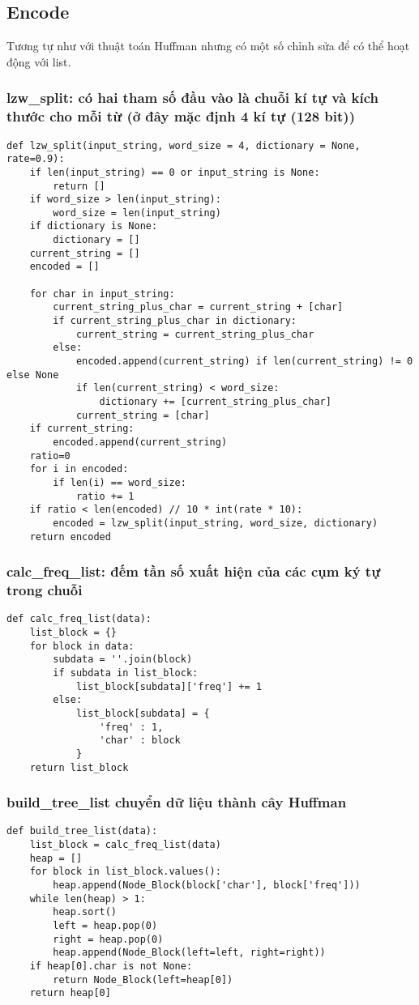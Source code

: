 \subsection{Encode}
Tương tự như với thuật toán Huffman nhưng có một số chỉnh sửa để có thể hoạt động với list.
    \subsubsection{lzw\_split: có hai tham số đầu vào là chuỗi kí tự và kích thước cho mỗi từ (ở đây mặc định 4 kí tự (128 bit))}
        \begin{lstlisting}
def lzw_split(input_string, word_size = 4, dictionary = None, rate=0.9):
    if len(input_string) == 0 or input_string is None:
        return []
    if word_size > len(input_string):
        word_size = len(input_string)
    if dictionary is None:
        dictionary = []
    current_string = []
    encoded = []

    for char in input_string:
        current_string_plus_char = current_string + [char]
        if current_string_plus_char in dictionary:
            current_string = current_string_plus_char
        else:
            encoded.append(current_string) if len(current_string) != 0 else None
            if len(current_string) < word_size:
                dictionary += [current_string_plus_char]
            current_string = [char]
    if current_string:
        encoded.append(current_string)
    ratio=0
    for i in encoded:
        if len(i) == word_size:
            ratio += 1
    if ratio < len(encoded) // 10 * int(rate * 10):
        encoded = lzw_split(input_string, word_size, dictionary)
    return encoded
        \end{lstlisting}
    \subsubsection{calc\_freq\_list: đếm tần số xuất hiện của các cụm ký tự trong chuỗi}
        \begin{lstlisting}
def calc_freq_list(data):
    list_block = {}
    for block in data:
        subdata = ''.join(block)
        if subdata in list_block:
            list_block[subdata]['freq'] += 1
        else:
            list_block[subdata] = {
                'freq' : 1,
                'char' : block
            }
    return list_block
        \end{lstlisting}    
    \subsubsection{build\_tree\_list chuyển dữ liệu thành cây Huffman}
         \begin{lstlisting}
def build_tree_list(data):
    list_block = calc_freq_list(data)
    heap = []
    for block in list_block.values():
        heap.append(Node_Block(block['char'], block['freq']))
    while len(heap) > 1:
        heap.sort()
        left = heap.pop(0)
        right = heap.pop(0)
        heap.append(Node_Block(left=left, right=right))
    if heap[0].char is not None:
        return Node_Block(left=heap[0])
    return heap[0]
        \end{lstlisting}

